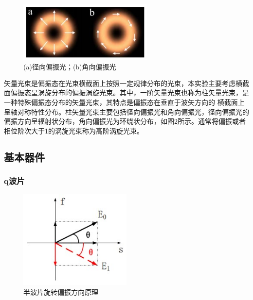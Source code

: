 \documentclass[a4paper,UTF8]{ctexart}
\begin{document}
\begin{figure}[H]
    \centering
    \begin{minipage}[b]{0.9\textwidth}
        \centering
        \includegraphics[width=0.6\textwidth]{./fig3.jpg}
        \caption{(a)径向偏振光；(b)角向偏振光}
    \end{minipage}
\end{figure}

矢量光束是偏振态在光束横截面上按照一定规律分布的光束，本实验主要考虑横截面偏振态呈涡旋分布的偏振涡旋光束。其中，一阶矢量光束也称为柱矢量光束，是一种特殊偏振态分布的矢量光束，其特点是偏振态在垂直于波矢方向的
横截面上呈轴对称特性分布。柱矢量光束主要包括径向偏振光和角向偏振光，径向偏振光的偏振方向呈辐射状分布，角向偏振光为环绕状分布，如图2所示。通常将偏振或者相位阶次大于1的涡旋光束称为高阶涡旋光束。

\subsection{基本器件}

\subsubsection{q波片}

\begin{figure}[H]
    \centering
    \begin{minipage}[b]{0.9\textwidth}
        \centering
        \includegraphics[width=0.5\textwidth]{./fig4.jpg}
        \caption{半波片旋转偏振方向原理}
    \end{minipage}
\end{figure}
\end{document}
